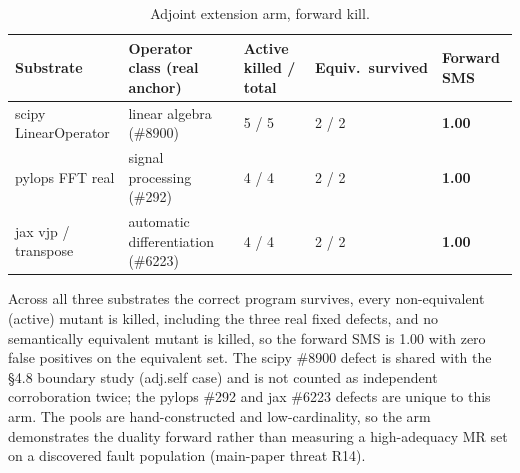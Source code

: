 \documentclass[review,12pt,authoryear]{elsarticle}
\begin{document}
{\def\LTcaptype{table} %
\begin{longtable}[]{@{}p{2.0cm}p{3.2cm}p{2.5cm}p{1.8cm}p{1.8cm}@{}}
\caption{Adjoint extension arm, forward kill.}\label{tab:suppl-adjoint}\\
\toprule\noalign{}
Substrate & Operator class (real anchor) & Active killed / total & Equiv.\ survived & Forward SMS \\
\midrule\noalign{}
\endfirsthead
\endhead
\bottomrule\noalign{}
\endlastfoot
scipy LinearOperator & linear algebra (\#8900) & 5 / 5 & 2 / 2 & \textbf{1.00} \\
pylops FFT real & signal processing (\#292) & 4 / 4 & 2 / 2 & \textbf{1.00} \\
jax vjp / transpose & automatic differentiation (\#6223) & 4 / 4 & 2 / 2 & \textbf{1.00} \\
\end{longtable}
}

Across all three substrates the correct program survives, every
non-equivalent (active) mutant is killed, including the three real
fixed defects, and no semantically equivalent mutant is killed, so the
forward SMS is 1.00 with zero false positives on the equivalent set. The
scipy \#8900 defect is shared with the §4.8 boundary study (adj.self case)
and is not counted as independent corroboration twice; the pylops \#292
and jax \#6223 defects are unique to this arm. The pools are
hand-constructed and low-cardinality, so the arm demonstrates the duality
forward rather than measuring a high-adequacy MR set on a discovered fault
population (main-paper threat R14).



\end{document}
